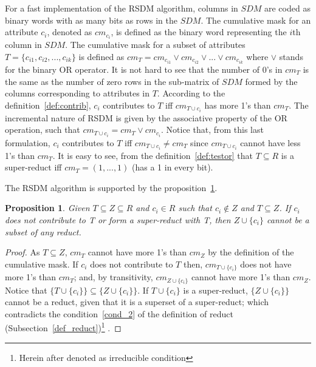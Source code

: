\documentclass[authoryear,11pt]{elsarticle}
\newtheorem{proposition}{Proposition}
\newtheorem{proof}{Proof}
\begin{document}
	For a fast implementation of the RSDM algorithm, columns in $SDM$ are coded as binary words with as many 
	bits as 	rows in the $SDM$. The cumulative mask for an attribute $c_i$, denoted as $cm_{c_i}$, is defined as 
	the binary word representing the $i$th column in $SDM$. The cumulative mask for a subset of attributes
	$T=\lbrace c_{i1},c_{i2},...,c_{ik} \rbrace$ is defined	as $cm_T = cm_{c_{i1}} \vee cm_{c_{i2}} \vee ... 
	\vee cm_{c_{ik}}$ where $\vee$ stands for the binary OR operator. It is not hard to see that the number of 
	0's in $cm_T$ is the same as the number of zero rows in the sub-matrix of $SDM$ formed by the columns
	corresponding to attributes in $T$. 
	According to the definition~\ref{def:contrib}, $c_i$ contributes to $T$ iff $cm_{T\cup c_i}$ has more 1's than 
	$cm_T$. 	The incremental nature of RSDM is given by the associative property of the OR operation, such that 
	$cm_{T\cup c_i}=cm_T\vee cm_{c_i}$. Notice that, from this last formulation, $c_i$ contributes to $T$ iff 
	$cm_{T\cup c_i}\neq cm_T$ since $cm_{T\cup c_i}$ cannot have less 1's than $cm_T$. It is easy to see, from the
	definition~\ref{def:testor} that $T \subseteq R$ is a super-reduct iff $cm_T=(1,...,1)$ (has a 1 in every bit).
	
	The RSDM algorithm is supported by the proposition~\ref{prop3}.		
	
	\begin{proposition}\label{prop3} 
		Given $T \subseteq Z \subseteq R$ and  $c_i \in R$ such that $c_i \notin Z$ and $T \subseteq Z$. If 
		$c_i$ does not contribute to T or form a super-reduct with T, then $Z\cup\{c_i\}$ cannot be a subset of any 
		reduct.
	\end{proposition}	
	
	\begin{proof}
		As $T \subseteq Z$, $cm_T$ cannot have more 1's than $cm_Z$ by the definition of the cumulative mask.
		If $c_i$ does not contribute to $T$ then, $cm_{T \cup \lbrace c_i \rbrace}$ does not have more 1's than
		$cm_T$; and, by transitivity, $cm_{Z \cup \lbrace c_i \rbrace}$ cannot have more 1's than $cm_Z$. 
		Notice that  $\lbrace T \cup \lbrace c_i \rbrace\rbrace \subseteq \lbrace Z \cup \lbrace c_i
		\rbrace\rbrace$.
		If $T \cup \lbrace c_i \rbrace$ is a super-reduct, $\lbrace Z \cup \lbrace c_i \rbrace\rbrace$ cannot be a 
		reduct, given that it is a superset of a super-reduct; which contradicts the condition~\ref{cond_2} of the
		definition of reduct (Subsection~\ref{def_reduct})\footnote{Herein after denoted as irreducible condition} .
	\end{proof}
\end{document}
